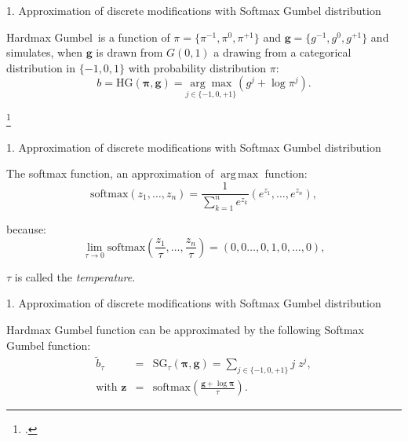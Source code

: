 \documentclass[10pt,aspectratio=169]{beamer}
\renewcommand{\vec}[1]{\mathbf{#1}}
\DeclareMathOperator*{\argmax}{arg\,max}
\begin{document}
\begin{frame}{1. Approximation of discrete modifications with Softmax Gumbel distribution}

    \begin{tcolorbox}[colback=lightgreen,colframe=greentheme,title=\textbf{Definition} (Hardmax Gumbel Function)]
        Hardmax Gumbel\footnotemark~is a function of  $\pi = \{\pi^{-1},\pi^{0}, \pi^{+1}\}$ and $\vec{g} = \{g^{-1},g^{0}, g^{+1}\}$ and simulates, when $\vec{g}$ is drawn from $G(0,1)$ a drawing from a categorical distribution in $\{-1,0,1\}$ with probability distribution $\pi$:  
        \begin{equation}
            b = \mbox{HG}(\bm{\pi}, \vec{g}) = \underset{{j \in \{-1,0,+1\}}}{\arg \max} (g^j+ \log \pi^j).
        \end{equation}
    \end{tcolorbox}

    \footcitetext{jang2016categorical}

\end{frame}

\begin{frame}{1. Approximation of discrete modifications with Softmax Gumbel distribution}
    
    The softmax function, an approximation of $\argmax$ function:
    \begin{equation}
        \mbox{softmax}\left(z_1,\ldots,z_n\right) = \frac{1}{\sum_{k=1}^n e^{z_k}}(e^{z_1},\ldots,e^{z_n}),
    \end{equation}

    because: 
    \begin{equation}
        \lim_{\tau \rightarrow 0} \mbox{softmax}\left(\frac{z_1}{\tau},\ldots,\frac{z_n}{\tau}\right) = (0,0\ldots,0,1,0,\dots, 0), 
    \end{equation}

    $\tau$ is called the \emph{temperature}.

\end{frame}

\begin{frame}{1. Approximation of discrete modifications with Softmax Gumbel distribution}
    
    \begin{tcolorbox}[colback=lightgreen,colframe=greentheme,title=\textbf{Definition} (Softmax Gumbel Function)]

        Hardmax Gumbel function can be approximated by the following Softmax Gumbel function: 
        \begin{eqnarray}\label{eq:softmaxgumbel} 
            \tilde{b}_{\tau} &=& \mbox{SG}_\tau(\bm{\pi}, \vec{g}) = \sum_{j \in \{-1,0,+1\}} j\;z^j,\\
            \text{with } \vec{z} &=& \mbox{softmax}\left(\frac{\vec{g}+\log \bm{\pi}}{\tau}\right).
        \end{eqnarray}

    \end{tcolorbox}

\end{frame}
\end{document}
